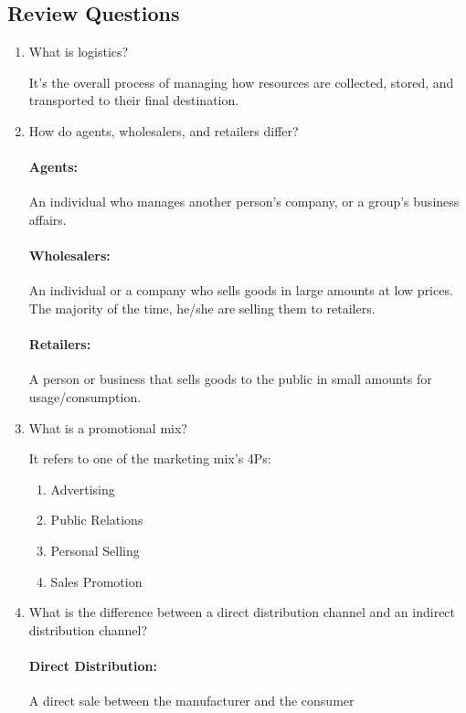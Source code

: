 \subsection{Review Questions}

\begin{enumerate}
  \item What is logistics?
      \begin{definition}[Logistics]
        It's the overall process of managing how resources are collected, stored,
        and transported to their final destination.
      \end{definition}
  \item How do agents, wholesalers, and retailers differ?
      \paragraph{Agents:} An individual who manages another person's company, or a
        group's business affairs.
      \paragraph{Wholesalers:} An individual or a company who sells goods in large
        amounts at low prices. The majority of the time, he/she are selling them to
        retailers.
      \paragraph{Retailers:} A person or business that sells goods to the public
      in small amounts for usage/consumption.
  \item What is a promotional mix?
      \begin{definition}
        It refers to one of the marketing mix's 4Ps:
        \begin{enumerate}
          \item Advertising
          \item Public Relations
          \item Personal Selling
          \item Sales Promotion
        \end{enumerate}
      \end{definition}
  \item What is the difference between a direct distribution channel and an
    indirect distribution channel?
      \paragraph{Direct Distribution:} A direct sale between the manufacturer
        and the consumer

\end{enumerate}
